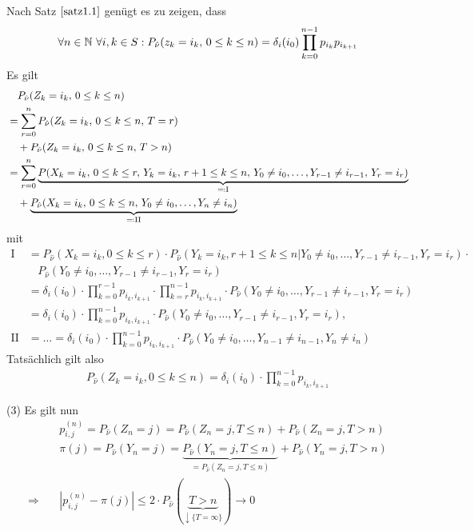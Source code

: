 \documentclass[a4paper,twoside,DIV15,BCOR12mm]{scrbook}
\begin{document}
\begin{beweis}
Nach Satz $\ref{satz1.1}$ genügt es zu zeigen, dass
\[\forall n\in\mathbb{N}\ \forall i,k\in S: P_{\hat\nu}(z_k=i_k,\, 0\le k\le n) = \delta_i(i_0) \prod_{k=0}^{n-1}p_{i_k}p_{i_{k+1}}\]
Es gilt
\begin{align*}
&\quad P_{\hat \nu}(Z_k=i_k,\,0\le k\le n)\\
&= \sum_{r=0}^n P_{\hat \nu}(Z_k=i_k,\, 0\le k\le n,\, T=r)\\
&\quad + P_{\hat \nu}(Z_k = i_k,\, 0\le k \le n,\, T>n) \\
&= \sum_{r=0}^n \underbrace{P(X_k = i_k,\, 0\le k\le r,\, Y_k=i_k,\, r+1\le k\le n,\, Y_0\ne i_0,\ldots, Y_{r-1}\ne i_{r-1},\, Y_r=i_r)}_{\ad \text{I}} \\
&\quad + \underbrace{P_{\hat \nu}(X_k = i_k, \, 0\le k\le n,\, Y_0\ne i_0,\ldots,Y_n\ne i_n)}_{\ad \text{II}}
\end{align*}
mit
\begin{align*}
  \text{I} &= P_{\hat \nu}(X_k = i_k, 0 \leq k \leq r) \cdot P_{\hat \nu}(Y_k = i_k, r+1 \leq k \leq n | Y_0 \neq i_0, \ldots, Y_{r-1} \neq i_{r-1}, Y_r = i_r) \cdot\\
           &~~~~ P_{\hat \nu}(Y_0 \neq i_0, \ldots, Y_{r-1} \neq i_{r-1}, Y_r = i_r)\\
           &= \delta_i(i_0) \cdot \prod_{k=0}^{r-1} p_{i_k,i_{k+1}} \cdot \prod_{k=r}^{n-1} p_{i_k,i_{k+1}} \cdot P_{\hat \nu}(Y_0 \neq i_0, \ldots, Y_{r-1} \neq i_{r-1}, Y_r = i_r)\\
           &= \delta_i(i_0) \cdot \prod_{k=0}^{n-1} p_{i_k,i_{k+1}} \cdot P_{\hat \nu}(Y_0 \neq i_0, \ldots, Y_{r-1} \neq i_{r-1}, Y_r = i_r),\\
  \text{II} &= \ldots = \delta_i(i_0) \cdot \prod_{k=0}^{n-1} p_{i_k,i_{k+1}} \cdot P_{\hat \nu}(Y_0 \neq i_0, \ldots, Y_{n-1} \neq i_{n-1}, Y_n \neq i_n)
\end{align*}
Tatsächlich gilt also
\begin{align*}
  P_{\hat \nu}(Z_k=i_k, 0 \leq k \leq n) = \delta_i(i_0) \cdot \prod_{k=0}^{n-1} p_{i_k,i_{k+1}}
\end{align*}

(3) Es gilt nun
\begin{align*}
    &p_{i,j}^{(n)} = P_{\hat \nu}(Z_n = j) = P_{\hat \nu}(Z_n = j, T \leq n) + P_{\hat \nu}(Z_n = j, T > n)\\
    &\pi(j) = P_{\hat \nu}(Y_n = j) = \underbrace{P_{\hat \nu}(Y_n = j, T \leq n)}_{= P_{\hat \nu}(Z_n = j, T \leq n)} + P_{\hat \nu}(Y_n = j, T > n)\\
  \Rightarrow \quad &|p_{i,j}^{(n)} - \pi(j)| \leq 2 \cdot P_{\hat \nu}(\underbrace{T > n}_{\downarrow \{T = \infty\}}) \longrightarrow 0
\end{align*}
\end{beweis}
\end{document}
